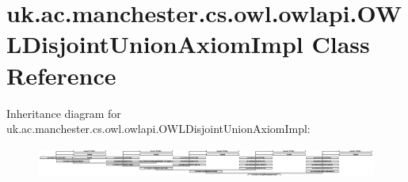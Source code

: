 \hypertarget{classuk_1_1ac_1_1manchester_1_1cs_1_1owl_1_1owlapi_1_1_o_w_l_disjoint_union_axiom_impl}{\section{uk.\-ac.\-manchester.\-cs.\-owl.\-owlapi.\-O\-W\-L\-Disjoint\-Union\-Axiom\-Impl Class Reference}
\label{classuk_1_1ac_1_1manchester_1_1cs_1_1owl_1_1owlapi_1_1_o_w_l_disjoint_union_axiom_impl}
}
Inheritance diagram for uk.\-ac.\-manchester.\-cs.\-owl.\-owlapi.\-O\-W\-L\-Disjoint\-Union\-Axiom\-Impl\-:\begin{figure}[H]
\begin{center}
\leavevmode
\includegraphics[height=1.020501cm]{classuk_1_1ac_1_1manchester_1_1cs_1_1owl_1_1owlapi_1_1_o_w_l_disjoint_union_axiom_impl}
\end{center}
\end{figure}
